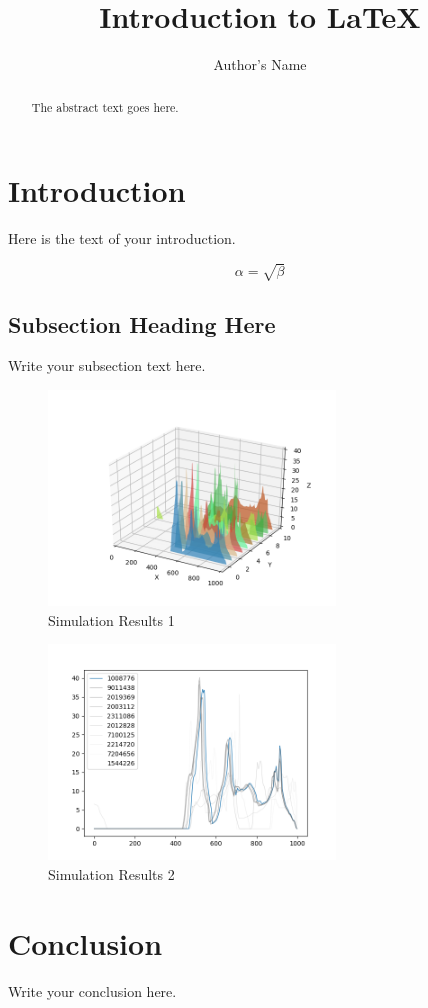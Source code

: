 \documentclass{article}
\begin{document}
\title{Introduction to \LaTeX{}}
\author{Author's Name}

\maketitle

\begin{abstract}
The abstract text goes here.
\end{abstract}

\section{Introduction}
Here is the text of your introduction.

\begin{equation}
    \label{simple_equation}
    \alpha = \sqrt{ \beta }
\end{equation}

\subsection{Subsection Heading Here}
Write your subsection text here.

\begin{figure}
    \centering
    \includegraphics[width=3.0in]{1_3d.png}
    \caption{Simulation Results 1}
    \label{simulationfigure}
\end{figure}

\begin{figure}
    \centering
    \includegraphics[width=3.0in]{1.png}
    \caption{Simulation Results 2}
    \label{simulationfigure}
\end{figure}

\section{Conclusion}
Write your conclusion here.
\end{document}
